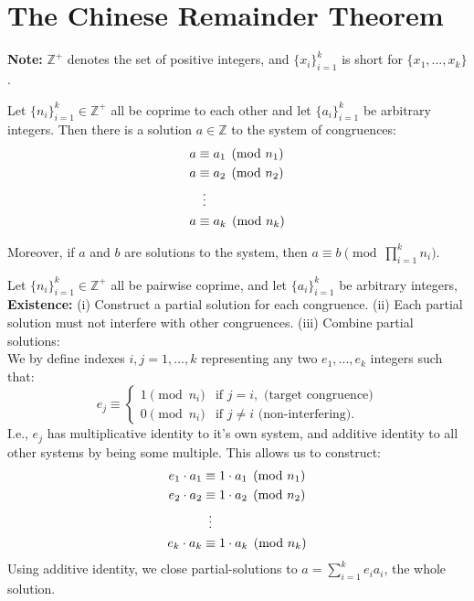 

\section{The Chinese Remainder Theorem}

\begin{Note}
    \textbf{Note:} $\mathbb{Z}^+$ denotes the set of positive integers, and $\{x_i\}_{i=1}^k$ is short for $\{x_1,...,x_k\}$.
\end{Note}
\begin{theo}

    Let $\{n_i\}_{i=1}^k\in\mathbb{Z}^+$ all be coprime to each other and let $\{a_i\}_{i=1}^k$ be arbitrary integers. Then there is a solution $a\in\mathbb{Z}$ to the system of congruences:
    \begin{align*}
        a &\equiv a_1 \pmod{n_1} \\
        a &\equiv a_2 \pmod{n_2} \\
        &\hspace*{.5em}\vdots \\
        a &\equiv a_k \pmod{n_k}
    \end{align*}
    
    
    \noindent
    Moreover, if $a$ and $b$ are solutions to the system, then $a\equiv b\pmod{\prod_{i=1}^k n_i}$.
\end{theo}
\begin{Proof}
Let $\{n_i\}_{i=1}^k\in\mathbb{Z}^+$ all be pairwise coprime, and let $\{a_i\}_{i=1}^k$ be arbitrary integers,\\

\noindent
\textbf{Existence:} (i) Construct a partial solution for each congruence. (ii) Each
partial solution must not interfere with other congruences. (iii) Combine partial solutions:\\

\noindent
We by define indexes $i,j=1,...,k$ representing any two $e_1,...,e_k$ integers such that:
 \[e_j \equiv
 \begin{cases} 
 1 \pmod{n_i} & \text{if } j = i, \text{ (target congruence)}\\
 0 \pmod{n_i} & \text{if } j \neq i \text{ (non-interfering)}.
 \end{cases}
 \]
 I.e., $e_j$ has multiplicative identity to it's own system, and additive identity to all other systems
 by being some multiple. This allows us to construct:
 \begin{align*}
    e_1\cdot a_1 &\equiv 1\cdot a_1 \pmod{n_1} \\
    e_2\cdot a_2 &\equiv 1\cdot a_2 \pmod{n_2} \\
    &\hspace*{.5em}\vdots \\
    e_k\cdot a_k &\equiv 1\cdot a_k \pmod{n_k}
\end{align*}
Using additive identity, we close partial-solutions to $a = \sum_{i=1}^k e_ia_i$, the whole solution.
\end{Proof}

